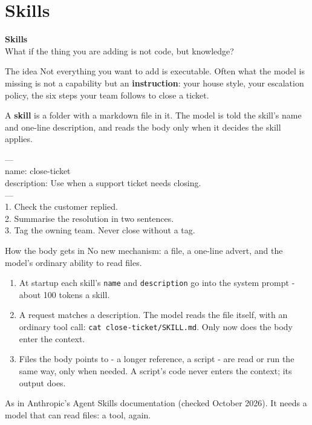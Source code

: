 \documentclass[aspectratio=169]{beamer}
\newcommand{\codebox}[1]{%
  \begin{center}
  \begin{tcolorbox}[colback=lightbg, colframe=gray, boxrule=0.5pt, arc=2pt,
                    width=0.94\textwidth, left=4pt, right=4pt, top=3pt, bottom=3pt]
    \ttfamily\scriptsize #1
  \end{tcolorbox}
  \end{center}}
\newcommand{\sectiontransition}[2]{%
  \begin{frame}[plain]
    \vfill
    \begin{center}
      {\Huge\bfseries\color{popblue} #1}\\[1.1em]
      {\large #2}
    \end{center}
    \vfill
  \end{frame}}
\begin{document}
\section{Skills}
\sectiontransition{Skills}{What if the thing you are adding is not code, but knowledge?}

\begin{frame}{The idea}
  \vspace{0.7em}
  Not everything you want to add is executable. Often what the model is missing is not a
  capability but an \textbf{instruction}: your house style, your escalation policy, the six
  steps your team follows to close a ticket.

  \vspace{0.9em}
  A \textbf{skill} is a folder with a markdown file in it. The model is told the skill's name
  and one-line description, and reads the body only when it decides the skill applies.

  \codebox{---\\
  name: close-ticket\\
  description: Use when a support ticket needs closing.\\
  ---\\[0.4em]
  1. Check the customer replied.\\
  2. Summarise the resolution in two sentences.\\
  3. Tag the owning team. Never close without a tag.}
\end{frame}

\begin{frame}{How the body gets in}
  \vspace{0.2em}
  {\small No new mechanism: a file, a one-line advert, and the model's ordinary ability to read
  files.}

  \vspace{0.3em}
  \begin{enumerate}
    \item[\textbf{1.}] At startup each skill's \texttt{name} and \texttt{description} go into
      the system prompt - about 100 tokens a skill.
    \item[\textbf{2.}] A request matches a description. The model reads the file itself, with
      an ordinary tool call: \texttt{cat close-ticket/SKILL.md}. Only now does the body enter
      the context.
    \item[\textbf{3.}] Files the body points to - a longer reference, a script - are read or
      run the same way, only when needed. A script's code never enters the context; its
      output does.
  \end{enumerate}

  \vspace{0.2em}
  {\footnotesize\color{gray}As in Anthropic's Agent Skills documentation (checked October 2026).
  It needs a model that can read files: a tool, again.}
\end{frame}
\end{document}
